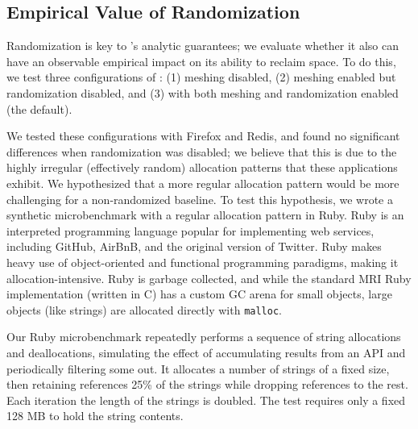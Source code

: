 \subsection{Empirical Value of Randomization}
\label{sec:evaluation:practical}

Randomization is key to \Mesh{}'s analytic guarantees; we evaluate
whether it also can have an observable empirical impact on its ability
to reclaim space. To do this, we test three configurations of \Mesh:
(1) meshing disabled, (2) meshing enabled but randomization disabled,
and (3) \Mesh with both meshing and randomization enabled (the
default).

We tested these configurations with Firefox and Redis, and found no
significant differences when randomization was disabled; we believe
that this is due to the highly irregular (effectively random)
allocation patterns that these applications exhibit. We hypothesized
that a more regular allocation pattern would be more challenging for a
non-randomized baseline. To test this hypothesis, we wrote a synthetic
microbenchmark with a regular allocation pattern in Ruby. Ruby is an
interpreted programming language popular for implementing web
services, including GitHub, AirBnB, and the original version of
Twitter.  Ruby makes heavy use of object-oriented and functional
programming paradigms, making it allocation-intensive.  Ruby is
garbage collected, and while the standard MRI Ruby implementation
(written in C) has a custom GC arena for small objects, large objects
(like strings) are allocated directly with \texttt{malloc}.

Our Ruby microbenchmark repeatedly performs a sequence of string
allocations and deallocations, simulating the effect of accumulating
results from an API and periodically filtering some out. It allocates
a number of strings of a fixed size, then retaining references 25\% of
the strings while dropping references to the rest.  Each iteration the
length of the strings is doubled.  The test requires only a fixed 128
MB to hold the string contents.

